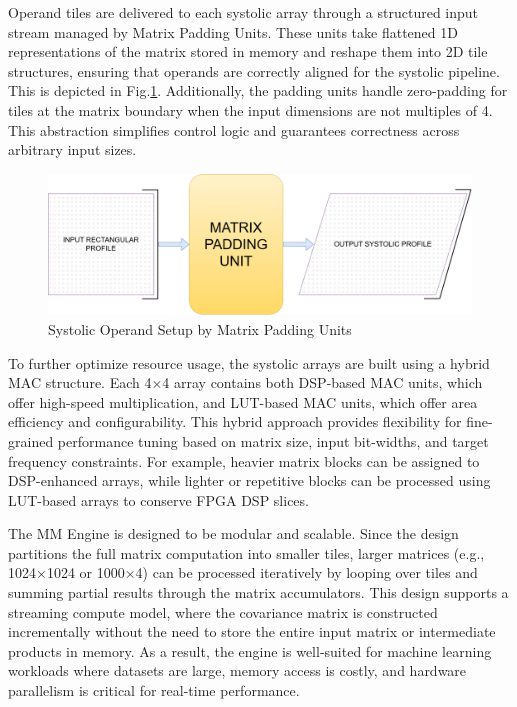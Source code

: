 Operand tiles are delivered to each systolic array through a structured input stream managed by Matrix Padding Units. These units take flattened 1D representations of the matrix stored in memory and reshape them into 2D tile structures, ensuring that operands are correctly aligned for the systolic pipeline. This is depicted in Fig.\ref{fig:systolic_array_setup}. Additionally, the padding units handle zero-padding for tiles at the matrix boundary when the input dimensions are not multiples of 4. This abstraction simplifies control logic and guarantees correctness across arbitrary input sizes.

\begin{figure}
	\centerline{\includegraphics[scale = 0.35]{Figures/systolic_array_setup.png}}
	\caption{Systolic Operand Setup by Matrix Padding Units}
	\label{fig:systolic_array_setup}
\end{figure}

To further optimize resource usage, the systolic arrays are built using a hybrid MAC structure. Each 4×4 array contains both DSP-based MAC units, which offer high-speed multiplication, and LUT-based MAC units, which offer area efficiency and configurability. This hybrid approach provides flexibility for fine-grained performance tuning based on matrix size, input bit-widths, and target frequency constraints. For example, heavier matrix blocks can be assigned to DSP-enhanced arrays, while lighter or repetitive blocks can be processed using LUT-based arrays to conserve FPGA DSP slices.

The MM Engine is designed to be modular and scalable. Since the design partitions the full matrix computation into smaller tiles, larger matrices (e.g., 1024×1024 or 1000×4) can be processed iteratively by looping over tiles and summing partial results through the matrix accumulators. This design supports a streaming compute model, where the covariance matrix is constructed incrementally without the need to store the entire input matrix or intermediate products in memory. As a result, the engine is well-suited for machine learning workloads where datasets are large, memory access is costly, and hardware parallelism is critical for real-time performance.    

